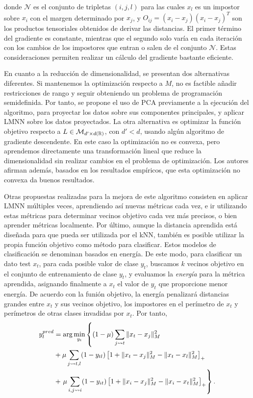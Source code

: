donde $\mathcal{N}$ es el conjunto de tripletas $(i,j,l)$ para las cuales $x_l$ es un impostor sobre $x_i$ con el margen determinado por $x_j$, y $O_{ij} = (x_i - x_j)(x_i - x_j)^T$ son los productos tensoriales obtenidos de derivar las distancias. El primer término del gradiente es constante, mientras que el segundo solo varía en cada iteración con los cambios de los impostores que entran o salen de el conjunto $\mathcal{N}$. Estas consideraciones permiten realizar un cálculo del gradiente bastante eficiente.

En cuanto a la reducción de dimensionalidad, se presentan dos alternativas diferentes. Si mantenemos la optimización respecto a $M$, no es factible añadir restricciones de rango y seguir obteniendo un problema de programación semidefinida. Por tanto, se propone el uso de PCA previamente a la ejecución del algoritmo, para proyectar los datos sobre sus componentes principales, y aplicar LMNN sobre los datos proyectados. La otra alternativa es optimizar la función objetivo respecto a $L \in \mathcal{M}_{d'\times d(\mathbb{R})}$, con $d' < d$, usando algún algoritmo de gradiente descendente. En este caso la optimización no es convexa, pero aprendemos directamente una transformación lineal que reduce la dimensionalidad sin realizar cambios en el problema de optimización. Los autores afirman además, basados en los resultados empíricos, que esta optimización no convexa da buenos resultados.

Otras propuestas realizadas para la mejora de este algoritmo consisten en aplicar LMNN múltiples veces, aprendiendo así nuevas métricas cada vez, e ir utilizando estas métricas para determinar vecinos objetivo cada vez más precisos, o bien aprender métricas localmente. Por último, aunque la distancia aprendida está diseñada para que pueda ser utilizada por el kNN, también es posible utilizar la propia función objetivo como método para clasificar. Estos modelos de clasificación se denominan basados en energía. De este modo, para clasificar un dato test $x_t$, para cada posible valor de clase $y_t$, buscamos $k$ vecinos objetivo en el conjunto de entrenamiento de clase $y_t$, y evaluamos la \emph{energía} para la métrica aprendida, asignando finalmente a $x_t$ el valor de $y_t$ que proporcione menor energía. De acuerdo con la funión objetivo, la energía penalizará distancias grandes entre $x_t$ y sus vecinos objetivo, los impostores en el perímetro de $x_t$ y perímetros de otras clases invadidas por $x_t$. Por tanto,
\begin{equation}
\begin{split}
 y_t^{pred} &= \arg\min_{y_t} \left\{ (1-\mu) \sum_{j \rightsquigarrow t} \|x_t-x_j\|_M^2 \right. \\
            &+ \mu \sum_{j \rightsquigarrow t,l} (1-y_{tl})\left[ 1 + \|x_t-x_j\|_M^2 - \|x_t-x_l\|_M^2\right]_+  \\
            &+ \left. \mu \sum_{i,j \rightsquigarrow i}(1 - y_{it}) \left[ 1 + \|x_i-x_j\|_M^2 - \|x_i-x_t\|_M^2\right]_+ \right\} .
\end{split}
\end{equation}


